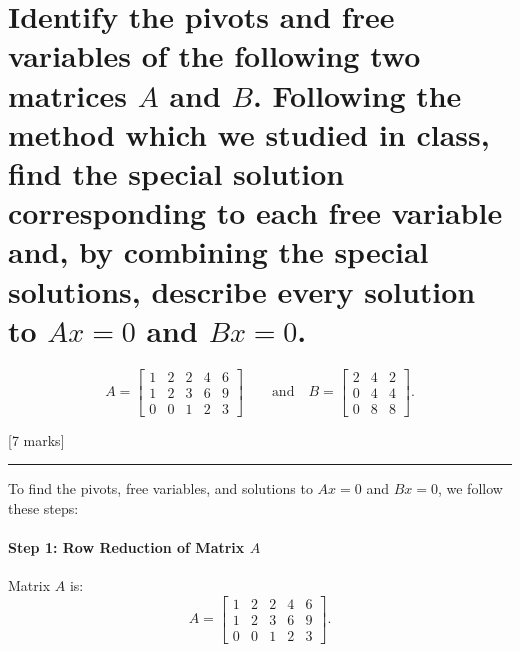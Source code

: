 \documentclass[11pt]{article}
\begin{document}
    \section{\texorpdfstring{Identify the pivots and free variables of the
following two matrices \(A\) and \(B\). Following the method which we
studied in class, find the special solution corresponding to each free
variable and, by combining the special solutions, describe every
solution to \(Ax=0\) and
\(Bx=0\).}{Identify the pivots and free variables of the following two matrices A and B. Following the method which we studied in class, find the special solution corresponding to each free variable and, by combining the special solutions, describe every solution to Ax=0 and Bx=0.}}\label{identify-the-pivots-and-free-variables-of-the-following-two-matrices-a-and-b.-following-the-method-which-we-studied-in-class-find-the-special-solution-corresponding-to-each-free-variable-and-by-combining-the-special-solutions-describe-every-solution-to-ax0-and-bx0.}

\[
A = 
\begin{bmatrix}
1 & 2 & 2 & 4 & 6 \\
1 & 2 & 3 & 6 & 9 \\
0 & 0 & 1 & 2 & 3
\end{bmatrix} \qquad \text{and} \quad
B = 
\begin{bmatrix}
2 & 4 & 2 \\
0 & 4 & 4 \\
0 & 8 & 8
\end{bmatrix}.
\]

{[}7 marks{]}

    \begin{center}\rule{0.5\linewidth}{0.5pt}\end{center}

To find the pivots, free variables, and solutions to \(Ax = 0\) and
\(Bx = 0\), we follow these steps:

\paragraph{\texorpdfstring{Step 1: Row Reduction of Matrix
\(A\)}{Step 1: Row Reduction of Matrix A}}\label{step-1-row-reduction-of-matrix-a}

Matrix \(A\) is: \[
A = 
\begin{bmatrix}
1 & 2 & 2 & 4 & 6 \\
1 & 2 & 3 & 6 & 9 \\
0 & 0 & 1 & 2 & 3
\end{bmatrix}.
\]
\end{document}
